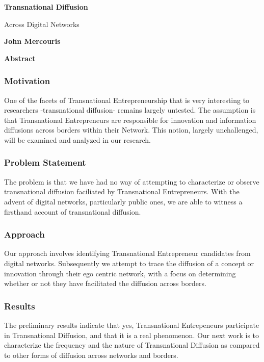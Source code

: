 \thispagestyle{plain}
\begin{center}
    \Large
    \textbf{Transnational Diffusion}
    
    \vspace{0.4cm}
    \large
    Across Digital Networks
    
    \vspace{0.4cm}
    \textbf{John Mercouris}
    
    \vspace{0.9cm}
    \textbf{Abstract}
\end{center}

\subsubsection{Motivation}
One of the facets of Transnational Entrepreneurship that is very interesting to researchers -transnational diffusion- remains largely untested. The assumption is that Transnational Entrepreneurs are responsible for innovation and information diffusions across borders within their Network. This notion, largely unchallenged, will be examined and analyzed in our research.

\subsubsection{Problem Statement}
The problem is that we have had no way of attempting to characterize or observe transnational diffusion faciliated by Transnational Entrepreneurs. With the advent of digital networks, particularly public ones, we are able to witness a firsthand account of transnational diffusion.

\subsubsection{Approach}
Our approach involves identifying Transnational Entrepreneur candidates from digital networks. Subsequently we attempt to trace the diffusion of a concept or innovation through their ego centric network, with a focus on determining whether or not they have facilitated the diffusion across borders.

\subsubsection{Results}
The preliminary results indicate that yes, Transnational Entrepeneurs participate in Transnational Diffusion, and that it is a real phenomenon. Our next work is to characterize the frequency and the nature of Transnational Diffusion as compared to other forms of diffusion across networks and borders.

